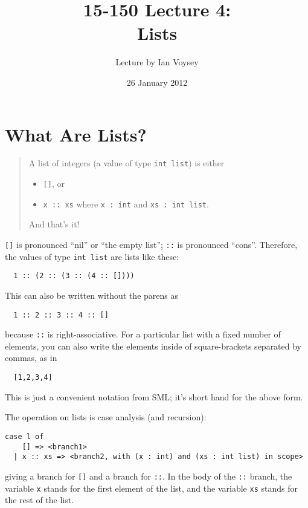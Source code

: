 \documentclass[11pt]{article}
\title{15-150 Lecture 4: \\ Lists}
\author{Lecture by Ian Voysey}
\date{26 January 2012}
\begin{document}
\maketitle

\noindent
\tableofcontents \newpage

\section{What Are Lists?}
\begin{framed}
\begin{quote}
A list of integers (a value of type \verb|int list|) is either
\begin{itemize}
\item[] \verb|[]|, or
\item[] \verb|x :: xs| where \verb|x : int| and \verb|xs : int list|.
\end{itemize}
And that's it!
\end{quote}
\end{framed}

\verb|[]| is pronounced ``nil'' or ``the empty list''; \verb|::| is
pronounced ``cons''. Therefore, the values of type \verb|int list| are
lists like these:
\begin{verbatim}
  1 :: (2 :: (3 :: (4 :: [])))
\end{verbatim}
This can also be written without the parens as
\begin{verbatim}
  1 :: 2 :: 3 :: 4 :: []
\end{verbatim}
because \verb|::| is right-associative. For a particular list with a fixed
number of elements, you can also write the elements inside of square-brackets
separated by commas, as in
\begin{verbatim}
  [1,2,3,4]
\end{verbatim}
This is just a convenient notation from SML; it's short hand for the above
form.
\begin{framed}
The operation on lists is case analysis (and recursion):
\begin{verbatim}
case l of
    [] => <branch1>
  | x :: xs => <branch2, with (x : int) and (xs : int list) in scope>
\end{verbatim}
\end{framed}

giving a branch for \verb|[]| and a branch for \verb|::|. In the body of
the \verb|::| branch, the variable \verb|x| stands for the first element of
the list, and the variable \verb|xs| stands for the rest of the list.
\end{document}
